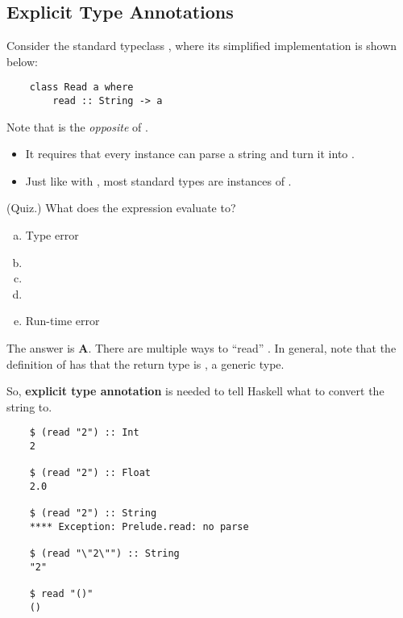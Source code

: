 \documentclass[letterpaper]{article}
\begin{document}
\subsection{Explicit Type Annotations}
Consider the standard typeclass , where its simplified implementation is shown below: 
\begin{verbatim}
    class Read a where 
        read :: String -> a\end{verbatim}

Note that  is the \emph{opposite} of . 
\begin{itemize}
    \item It requires that every instance  can parse a string and turn it into .
    \item Just like with , most standard types are instances of .
\end{itemize}

\begin{mdframed}[]
    (Quiz.) What does the expression  evaluate to? 
    \begin{enumerate}[(a)]
        \item Type error
        \item {}
        \item {}
        \item {}
        \item Run-time error 
    \end{enumerate}

    \begin{mdframed}[]
        The answer is \textbf{A}. There are multiple ways to ``read'' . In general, note that the definition of  has that the return type is , a generic type. 
    \end{mdframed}
\end{mdframed}

So, \textbf{explicit type annotation} is needed to tell Haskell what to convert the string to. 
\begin{verbatim}
    $ (read "2") :: Int 
    2 

    $ (read "2") :: Float 
    2.0 

    $ (read "2") :: String 
    **** Exception: Prelude.read: no parse 
    
    $ (read "\"2\"") :: String 
    "2"

    $ read "()"
    ()\end{verbatim}
\end{document}

